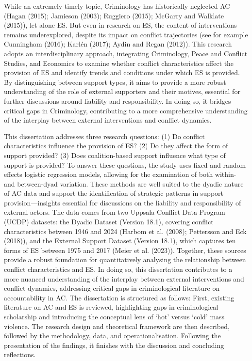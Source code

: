 \documentclass[
]{article}
\begin{document}
While an extremely timely topic, Criminology has historically neglected
AC (Hagan (2015); Jamieson (2003); Ruggiero (2015); McGarry and Walklate
(2015)), let alone ES. But even in research on ES, the content of
interventions remains underexplored, despite its impact on conflict
trajectories (see for example Cunningham (2016); Karlén (2017); Aydin
and Regan (2012)). This research adopts an interdisciplinary approach,
integrating Criminology, Peace and Conflict Studies, and Economics to
examine whether conflict characteristics affect the provision of ES and
identify trends and conditions under which ES is provided. By
distinguishing between support types, it aims to provide a more robust
understanding of the role of external supporters and their motives,
essential for further discussions around liability and responsibility.
In doing so, it bridges critical gaps in Criminology, contributing to a
more comprehensive understanding of the interplay between external
interventions and conflict dynamics.

This dissertation addresses three research questions: (1) Do conflict
characteristics influence the provision of ES? (2) Do they affect the
form of support provided? (3) Does coalition-based support influence
what type of support is provided? To answer these questions, the study
uses fixed and random effects logistic regression models, allowing for
the examination of both within- and between-dyad variation. These
methods are well suited to the dyadic nature of AC data and support the
identification of strategic patterns in support provision---insights
essential for discussions on the liability and responsibility of
external actors. The data comes from two Uppsala Conflict Data Program
(UCDP) datasets: the Dyadic Dataset (Version 18.1), covering conflict
characteristics between 1946 and 2024 (Harbom et al. (2008); Pettersson
and Eck (2018)), and the External Support Dataset (Version 18.1), which
captures ten forms of ES between 1975 and 2017 (Meier et al. (2023)).
Together, these sources provide a robust foundation for quantitatively
analysing the relationship between conflict characteristics and ES. In
doing so, this dissertation contributes to a more nuanced understanding
of the interplay between external interventions and conflict dynamics,
addressing critical gaps in criminological literature on accountability
in AC. The dissertation is structured as follows: First, existing
literature on AC and ES is reviewed, highlighting gaps in criminological
scholarship and introducing the conceptual lens of `hot' versus `cold'
mass violence. The research design and theoretical framework are then
described, followed by the methodology, data, and operationalisation.
Following the presentation of the findings, it finishes with the
discussion and concluding reflections.
\end{document}
